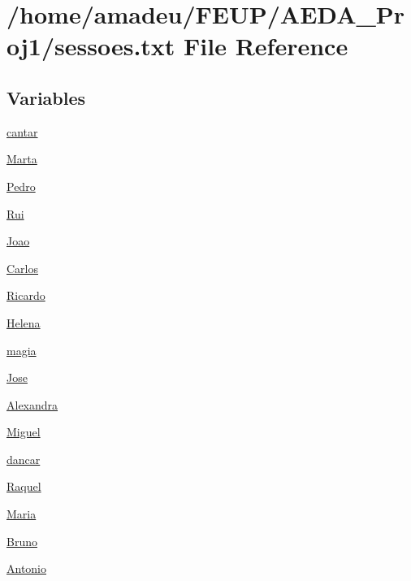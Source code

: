 \hypertarget{sessoes_8txt}{}\section{/home/amadeu/\+F\+E\+U\+P/\+A\+E\+D\+A\+\_\+\+Proj1/sessoes.txt File Reference}
\label{sessoes_8txt}
\subsection*{Variables}
\begin{DoxyCompactItemize}
\item 
\hyperlink{sessoes_8txt_a2616159a76d0e8a5493734758ae9c160}{cantar}
\item 
\hyperlink{sessoes_8txt_a766f9ab60ec18d5b80bf4153a38c2b64}{Marta}
\item 
\hyperlink{sessoes_8txt_a83ec618410e4714b08aa56507a10f025}{Pedro}
\item 
\hyperlink{sessoes_8txt_ae102a7586632535be9ea3d3f64768ab4}{Rui}
\item 
\hyperlink{sessoes_8txt_a6414eb73c2395148093f8baa9e202616}{Joao}
\item 
\hyperlink{sessoes_8txt_a8c64f18bebe8b957cbc75ce757dd3af4}{Carlos}
\item 
\hyperlink{sessoes_8txt_a508a855615268f4003a2dcef768b5abe}{Ricardo}
\item 
\hyperlink{sessoes_8txt_abc15862bdb1800c6fcdf948e0de62523}{Helena}
\item 
\hyperlink{sessoes_8txt_adb78776c95ad5bfba2eb9fce119157de}{magia}
\item 
\hyperlink{sessoes_8txt_a13cbd16d251cdd3a5b7719091bb517a7}{Jose}
\item 
\hyperlink{sessoes_8txt_aeb25d2279e6bf681577196df60fd4618}{Alexandra}
\item 
\hyperlink{sessoes_8txt_af582cac3444e41dc13a517bd4e6efbd7}{Miguel}
\item 
\hyperlink{sessoes_8txt_a7649ba4017592bd762abe5b976e6481e}{dancar}
\item 
\hyperlink{sessoes_8txt_aff6a0439a2c5c374e2852843155c2df4}{Raquel}
\item 
\hyperlink{sessoes_8txt_a0375353ca858a7b935ff53ef0a3c9a98}{Maria}
\item 
\hyperlink{sessoes_8txt_a33e5ff5ddbb7118468c3dd458466532b}{Bruno}
\item 
\hyperlink{sessoes_8txt_a8f0142e65cd12bdd0d475a7c68a99433}{Antonio}
\end{DoxyCompactItemize}


